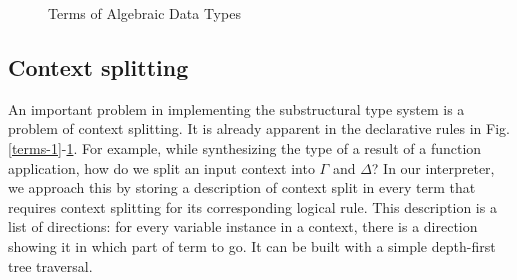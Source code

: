 \documentclass[a4paper,14pt]{extreport}
\begin{document}
\begin{figure}
    \centering
    \caption{Terms of Algebraic Data Types}
    \label{terms-2}
\end{figure}

\subsection{Context splitting}

An important problem in implementing the substructural type system is a problem
of context splitting. It is already apparent in the declarative rules in
Fig.\ref{terms-1}-\ref{terms-2}. For example, while synthesizing the type of a
result of a function application, how do we split an input context into $\Gamma$
and $\Delta$? In our interpreter, we approach this by storing a description of
context split in every term that requires context splitting for its
corresponding logical rule. This description is a list of directions: for every
variable instance in a context, there is a direction showing it in which part of
term to go. It can be built with a simple depth-first tree traversal.
\end{document}
